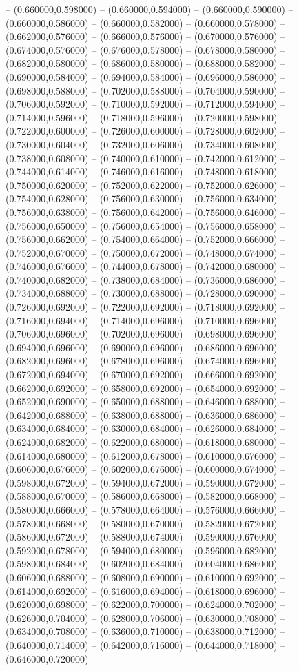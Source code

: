 -- (0.660000,0.598000) -- (0.660000,0.594000) -- (0.660000,0.590000) -- (0.660000,0.586000) -- (0.660000,0.582000) -- (0.660000,0.578000) -- (0.662000,0.576000) -- (0.666000,0.576000) -- (0.670000,0.576000) -- (0.674000,0.576000) -- (0.676000,0.578000) -- (0.678000,0.580000) -- (0.682000,0.580000) -- (0.686000,0.580000) -- (0.688000,0.582000) -- (0.690000,0.584000) -- (0.694000,0.584000) -- (0.696000,0.586000) -- (0.698000,0.588000) -- (0.702000,0.588000) -- (0.704000,0.590000) -- (0.706000,0.592000) -- (0.710000,0.592000) -- (0.712000,0.594000) -- (0.714000,0.596000) -- (0.718000,0.596000) -- (0.720000,0.598000) -- (0.722000,0.600000) -- (0.726000,0.600000) -- (0.728000,0.602000) -- (0.730000,0.604000) -- (0.732000,0.606000) -- (0.734000,0.608000) -- (0.738000,0.608000) -- (0.740000,0.610000) -- (0.742000,0.612000) -- (0.744000,0.614000) -- (0.746000,0.616000) -- (0.748000,0.618000) -- (0.750000,0.620000) -- (0.752000,0.622000) -- (0.752000,0.626000) -- (0.754000,0.628000) -- (0.756000,0.630000) -- (0.756000,0.634000) -- (0.756000,0.638000) -- (0.756000,0.642000) -- (0.756000,0.646000) -- (0.756000,0.650000) -- (0.756000,0.654000) -- (0.756000,0.658000) -- (0.756000,0.662000) -- (0.754000,0.664000) -- (0.752000,0.666000) -- (0.752000,0.670000) -- (0.750000,0.672000) -- (0.748000,0.674000) -- (0.746000,0.676000) -- (0.744000,0.678000) -- (0.742000,0.680000) -- (0.740000,0.682000) -- (0.738000,0.684000) -- (0.736000,0.686000) -- (0.734000,0.688000) -- (0.730000,0.688000) -- (0.728000,0.690000) -- (0.726000,0.692000) -- (0.722000,0.692000) -- (0.718000,0.692000) -- (0.716000,0.694000) -- (0.714000,0.696000) -- (0.710000,0.696000) -- (0.706000,0.696000) -- (0.702000,0.696000) -- (0.698000,0.696000) -- (0.694000,0.696000) -- (0.690000,0.696000) -- (0.686000,0.696000) -- (0.682000,0.696000) -- (0.678000,0.696000) -- (0.674000,0.696000) -- (0.672000,0.694000) -- (0.670000,0.692000) -- (0.666000,0.692000) -- (0.662000,0.692000) -- (0.658000,0.692000) -- (0.654000,0.692000) -- (0.652000,0.690000) -- (0.650000,0.688000) -- (0.646000,0.688000) -- (0.642000,0.688000) -- (0.638000,0.688000) -- (0.636000,0.686000) -- (0.634000,0.684000) -- (0.630000,0.684000) -- (0.626000,0.684000) -- (0.624000,0.682000) -- (0.622000,0.680000) -- (0.618000,0.680000) -- (0.614000,0.680000) -- (0.612000,0.678000) -- (0.610000,0.676000) -- (0.606000,0.676000) -- (0.602000,0.676000) -- (0.600000,0.674000) -- (0.598000,0.672000) -- (0.594000,0.672000) -- (0.590000,0.672000) -- (0.588000,0.670000) -- (0.586000,0.668000) -- (0.582000,0.668000) -- (0.580000,0.666000) -- (0.578000,0.664000) -- (0.576000,0.666000) -- (0.578000,0.668000) -- (0.580000,0.670000) -- (0.582000,0.672000) -- (0.586000,0.672000) -- (0.588000,0.674000) -- (0.590000,0.676000) -- (0.592000,0.678000) -- (0.594000,0.680000) -- (0.596000,0.682000) -- (0.598000,0.684000) -- (0.602000,0.684000) -- (0.604000,0.686000) -- (0.606000,0.688000) -- (0.608000,0.690000) -- (0.610000,0.692000) -- (0.614000,0.692000) -- (0.616000,0.694000) -- (0.618000,0.696000) -- (0.620000,0.698000) -- (0.622000,0.700000) -- (0.624000,0.702000) -- (0.626000,0.704000) -- (0.628000,0.706000) -- (0.630000,0.708000) -- (0.634000,0.708000) -- (0.636000,0.710000) -- (0.638000,0.712000) -- (0.640000,0.714000) -- (0.642000,0.716000) -- (0.644000,0.718000) -- (0.646000,0.720000) 
